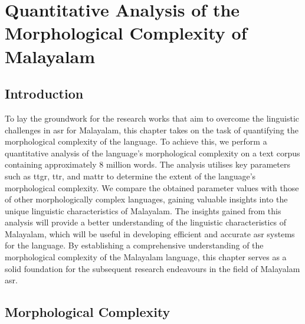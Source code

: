 \chapter{Quantitative Analysis of the Morphological Complexity of Malayalam}
\label{Ch:MorphologicalComplexity} %
\graphicspath{{Figures/chapter3-complexity/}}

\section{Introduction}

To lay the groundwork for the research works that aim to overcome the linguistic challenges in \gls{asr} for Malayalam, this chapter takes on the task of quantifying the morphological complexity of the language. To achieve this, we perform a quantitative analysis of the language's morphological complexity on a text corpus containing approximately 8 million words. The analysis utilises key parameters such as \gls{ttgr}, \gls{ttr}, and \gls{mattr} to determine the extent of the language's morphological complexity. We compare the obtained parameter values with those of other morphologically complex languages, gaining valuable insights into the unique linguistic characteristics of Malayalam.  The insights gained from this analysis will provide a better understanding of the linguistic characteristics of Malayalam, which will be useful in developing efficient and accurate \gls{asr} systems for the language. By establishing a comprehensive understanding of the morphological complexity of the Malayalam language, this chapter serves as a solid foundation for the subsequent research endeavours in the field of Malayalam \gls{asr}.


\section{Morphological Complexity}

